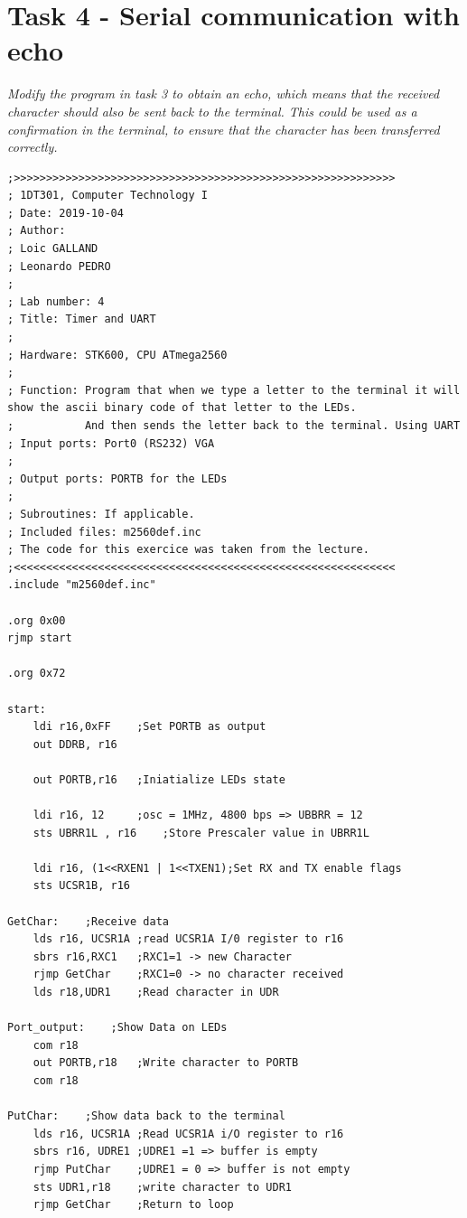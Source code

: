 \documentclass[a4paper,12pt]{article}
\begin{document}
\section{Task 4 - Serial communication with echo}
\textit{Modify the program in task 3 to obtain an echo, which means that the received character should
also be sent back to the terminal. This could be used as a confirmation in the terminal, to ensure
that the character has been transferred correctly.}

\lstset{style=Asm}
\begin{lstlisting}
;>>>>>>>>>>>>>>>>>>>>>>>>>>>>>>>>>>>>>>>>>>>>>>>>>>>>>>>>>>>
; 1DT301, Computer Technology I
; Date: 2019-10-04
; Author:
; Loic GALLAND
; Leonardo PEDRO
;
; Lab number: 4
; Title: Timer and UART
;
; Hardware: STK600, CPU ATmega2560
;
; Function: Program that when we type a letter to the terminal it will show the ascii binary code of that letter to the LEDs.
;			And then sends the letter back to the terminal. Using UART
; Input ports: Port0 (RS232) VGA 
;
; Output ports: PORTB for the LEDs 
;
; Subroutines: If applicable.
; Included files: m2560def.inc
; The code for this exercice was taken from the lecture.
;<<<<<<<<<<<<<<<<<<<<<<<<<<<<<<<<<<<<<<<<<<<<<<<<<<<<<<<<<<<
.include "m2560def.inc"

.org 0x00
rjmp start

.org 0x72

start:
	ldi r16,0xFF	;Set PORTB as output
	out DDRB, r16
	
	out PORTB,r16	;Iniatialize LEDs state

	ldi r16, 12		;osc = 1MHz, 4800 bps => UBBRR = 12
	sts UBRR1L , r16	;Store Prescaler value in UBRR1L

	ldi r16, (1<<RXEN1 | 1<<TXEN1);Set RX and TX enable flags 
	sts UCSR1B, r16

GetChar:	;Receive data
	lds r16, UCSR1A	;read UCSR1A I/0 register to r16
	sbrs r16,RXC1	;RXC1=1 -> new Character
	rjmp GetChar	;RXC1=0 -> no character received
	lds r18,UDR1	;Read character in UDR

Port_output:	;Show Data on LEDs
	com r18
	out PORTB,r18	;Write character to PORTB 
	com r18

PutChar:	;Show data back to the terminal
	lds r16, UCSR1A	;Read UCSR1A i/O register to r16
	sbrs r16, UDRE1	;UDRE1 =1 => buffer is empty 
	rjmp PutChar	;UDRE1 = 0 => buffer is not empty
	sts UDR1,r18	;write character to UDR1
	rjmp GetChar	;Return to loop
\end{lstlisting}
\end{document}
